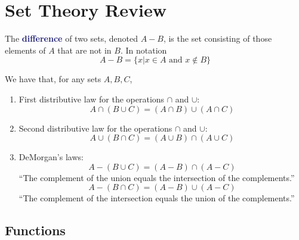 \documentclass[11pt]{article}
\numberwithin{equation}{section}
\newcommand{\navy}[1]{\textcolor{MidnightBlue}{\bf #1}}
\newcounter{theo}[section]\setcounter{theo}{0}
\theoremstyle{definition}
\theoremstyle{definition}
\newcommand{\1}{\mathbbm 1}
\begin{document}
\newpage
\appendix

\section{Set Theory Review}

\begin{definition}[Difference]
	The \navy{difference} of two sets, denoted $A-B$, is the set consisting of those elements of $A$ that are not in $B$. In notation
	\begin{equation*}
		A - B = \{x | x \in A \text{ and } x \not\in B\}	
	\end{equation*}
\end{definition}

\begin{theorem}
	We have that, for any sets $A, B, C$,
	\begin{enumerate}
		\item First distributive law for the operations $\cap$ and $\cup$:
		\begin{equation}
			A \cap (B \cup C) = (A \cap B) \cup (A \cap C)
		\end{equation}
		\item Second distributive law for the operations $\cap$ and $\cup$:
		\begin{equation}
			A \cup (B \cap C) = (A \cup B) \cap (A \cup C)
		\end{equation}
		\item DeMorgan's laws:
		\begin{equation}
			A - (B \cup C) = (A - B) \cap (A - C)
		\end{equation}
		``The complement of the union equals the intersection of the complements.''
		\begin{equation}
			A - (B \cap C) = (A - B) \cup (A - C)
		\end{equation}
		``The complement of the intersection equals the union of the complements.''
	\end{enumerate}
\end{theorem}

\subsection{Functions}
\end{document}

